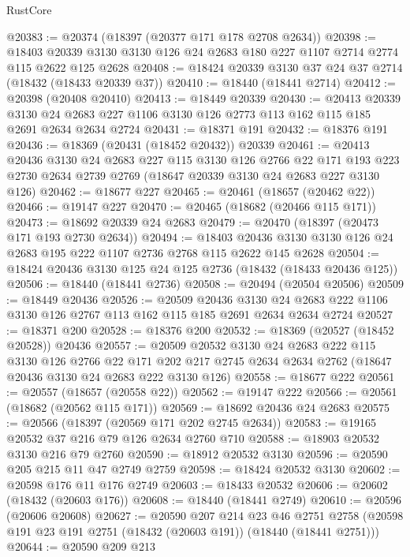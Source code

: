 \begin{lexlean}{RustCore}
\begin{coremodule}
@20383 := @20374 (@18397 (@20377 @171 @178 @2708 @2634))
@20398 := @18403 @20339 @3130 @3130 @126 @24 @2683 @180 @227 @1107 @2714 @2774 @115 @2622 @125 @2628
@20408 := @18424 @20339 @3130 @37 @24 @37 @2714 (@18432 (@18433 @20339 @37))
@20410 := @18440 (@18441 @2714)
@20412 := @20398 (@20408 @20410)
@20413 := @18449 @20339
@20430 := @20413
    @20339
    @3130
    @24
    @2683
    @227
    @1106
    @3130
    @126
    @2773
    @113
    @162
    @115
    @185
    @2691
    @2634
    @2634
    @2724
@20431 := @18371 @191
@20432 := @18376 @191
@20436 := @18369 (@20431 (@18452 @20432)) @20339
@20461 := @20413
    @20436
    @3130
    @24
    @2683
    @227
    @115
    @3130
    @126
    @2766
    @22
    @171
    @193
    @223
    @2730
    @2634
    @2739
    @2769
    (@18647 @20339 @3130 @24 @2683 @227 @3130 @126)
@20462 := @18677 @227
@20465 := @20461 (@18657 (@20462 @22))
@20466 := @19147 @227
@20470 := @20465 (@18682 (@20466 @115 @171))
@20473 := @18692 @20339 @24 @2683
@20479 := @20470 (@18397 (@20473 @171 @193 @2730 @2634))
@20494 := @18403 @20436 @3130 @3130 @126 @24 @2683 @195 @222 @1107 @2736 @2768 @115 @2622 @145 @2628
@20504 := @18424 @20436 @3130 @125 @24 @125 @2736 (@18432 (@18433 @20436 @125))
@20506 := @18440 (@18441 @2736)
@20508 := @20494 (@20504 @20506)
@20509 := @18449 @20436
@20526 := @20509
    @20436
    @3130
    @24
    @2683
    @222
    @1106
    @3130
    @126
    @2767
    @113
    @162
    @115
    @185
    @2691
    @2634
    @2634
    @2724
@20527 := @18371 @200
@20528 := @18376 @200
@20532 := @18369 (@20527 (@18452 @20528)) @20436
@20557 := @20509
    @20532
    @3130
    @24
    @2683
    @222
    @115
    @3130
    @126
    @2766
    @22
    @171
    @202
    @217
    @2745
    @2634
    @2634
    @2762
    (@18647 @20436 @3130 @24 @2683 @222 @3130 @126)
@20558 := @18677 @222
@20561 := @20557 (@18657 (@20558 @22))
@20562 := @19147 @222
@20566 := @20561 (@18682 (@20562 @115 @171))
@20569 := @18692 @20436 @24 @2683
@20575 := @20566 (@18397 (@20569 @171 @202 @2745 @2634))
@20583 := @19165 @20532 @37 @216 @79 @126 @2634 @2760 @710
@20588 := @18903 @20532 @3130 @216 @79 @2760
@20590 := @18912 @20532 @3130
@20596 := @20590 @205 @215 @11 @47 @2749 @2759
@20598 := @18424 @20532 @3130
@20602 := @20598 @176 @11 @176 @2749
@20603 := @18433 @20532
@20606 := @20602 (@18432 (@20603 @176))
@20608 := @18440 (@18441 @2749)
@20610 := @20596 (@20606 @20608)
@20627 := @20590
    @207
    @214
    @23
    @46
    @2751
    @2758
    (@20598 @191 @23 @191 @2751 (@18432 (@20603 @191)) (@18440 (@18441 @2751)))
@20644 := @20590
    @209
    @213

\end{coremodule}
\end{lexlean}
